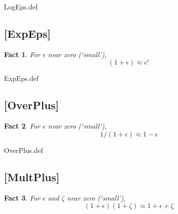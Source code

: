 \documentclass{handout}
\newtheorem{Fact}{Fact}
\begin{document}
\begin{verbatimwrite}{LogEps.def}
\providecommand{\LogEps}{\href{https://www.econ2.jhu.edu/people/ccarroll/public/LectureNotes/MathFacts/MathFactsList\#LogEps}{\ensuremath{\mathtt{[LogEps]}}}}
\end{verbatimwrite}


\hypertarget{ExpEps}{}
\subsection{[ExpEps]}
\begin{Fact} For $\epsilon$ near zero (`small'), 
\begin{equation}
(1+\epsilon) \approx e^{\epsilon}
\end{equation}
\end{Fact}

\begin{verbatimwrite}{ExpEps.def}
\providecommand{\ExpEps}{\href{https://www.econ2.jhu.edu/people/ccarroll/public/LectureNotes/MathFacts/MathFactsList\#ExpEps}{\ensuremath{\mathtt{[ExpEps]}}}}
\end{verbatimwrite}


\hypertarget{OverPlus}{}
\subsection{[OverPlus]}
\begin{Fact} For $\epsilon$ near zero (`small'), 
\begin{equation}
1/(1+\epsilon) \approx 1-\epsilon
\end{equation}
\end{Fact}

\begin{verbatimwrite}{OverPlus.def}
\providecommand{\OverPlus}{\href{https://www.econ2.jhu.edu/people/ccarroll/public/LectureNotes/MathFacts/MathFactsList\#OverPlus}{\ensuremath{\mathtt{[OverPlus]}}}}
\end{verbatimwrite}


\hypertarget{MultPlus}{}
\subsection{[MultPlus]}
\begin{Fact} For $\epsilon$ and $\zeta$ near zero (`small'), 
\begin{equation}
(1+\epsilon)(1+\zeta) \approx 1+\epsilon+\zeta
\end{equation}
\end{Fact}
\end{document}
